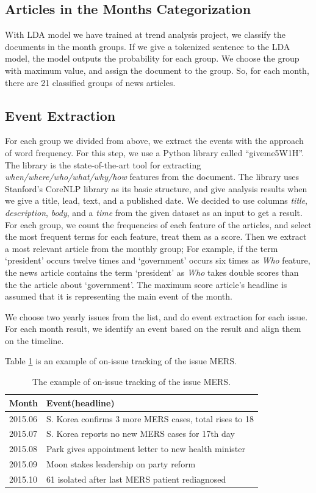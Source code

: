 \subsection{Articles in the Months Categorization}

With LDA model we have trained at trend analysis project,
we classify the documents in the month groups.
If we give a tokenized sentence to the LDA model,
the model outputs the probability for each group.
We choose the group with maximum value, and assign the document to the group.
So, for each month, there are 21 classified groups of news articles.

\subsection{Event Extraction}

For each group we divided from above,
we extract the events with the approach of word frequency.
For this step, we use a Python library called ``giveme5W1H''\cite{Hamborg2019b}.
The library is the state-of-the-art tool for extracting
\textit{when/where/who/what/why/how} features from the document.
The library uses Stanford's CoreNLP library as its basic structure,
and give analysis results when we give a
title, lead, text, and a published date.
We decided to use columns \textit{title}, \textit{description}, \textit{body}, and a \textit{time}
from the given dataset as an input to get a result.
For each group, we count the frequencies of each feature of the articles,
and select the most frequent terms for each feature, treat them as a score.
Then we extract a most relevant article from the monthly group;
For example, if the term `president' occurs twelve times and
`government' occurs six times as \textit{Who} feature,
the news article contains the term `president' as \textit{Who}
takes double scores than the the article about `government'.
The maximum score article's headline is assumed that it is
representing the main event of the month.

We choose two yearly issues from the list, and do event extraction for each issue.
For each month result, we identify an event based on the result and align them on the timeline.

Table \ref{table:onissue} is an example of on-issue tracking of the issue MERS.

\begin{table}[!htbp]
  \begin{tabular}{l|l}
  Month   & Event(headline)                                        \\ \hline
  2015.06 & S. Korea confirms 3 more MERS cases, total rises to 18 \\
  2015.07 & S. Korea reports no new MERS cases for 17th day        \\
  2015.08 & Park gives appointment letter to new health minister   \\
  2015.09 & Moon stakes leadership on party reform                 \\
  2015.10 & 61 isolated after last MERS patient rediagnosed       
  \end{tabular}
  \caption{The example of on-issue tracking of the issue MERS.}
  \label{table:onissue}
\end{table}